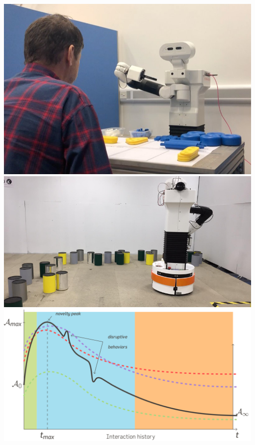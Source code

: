 \documentclass[xcolor=table]{beamer}
\begin{document}
\begin{frame}{}

            \hyperlink{croquignole}{\includegraphics[height=0.2\paperheight]{trust/Tiago_and_participant}}
            \hspace{0.5em}
            \hyperlink{dominos}{\includegraphics[trim=10cm 0 4cm 0,clip,height=0.2\paperheight]{dynamic-language/Preview_image}}
            \hspace{0.5em}
            \hyperlink{anthropomorphism}{\includegraphics[height=0.2\paperheight]{dynamics_anthropo}}


\end{frame}
\end{document}
